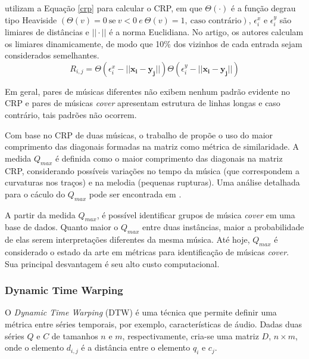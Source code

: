  utilizam a Equação \ref{crp} para calcular o CRP, em que \({\Theta(\cdot)}\) é a função degrau tipo Heaviside \({(\Theta(v) = 0 \ \textrm{se} \ v < 0 \  e \  \Theta(v) = 1, \ \textrm{caso contrário})}\), \({\epsilon_{i}^{x}}\) e \({\epsilon_{i}^{y}}\) são limiares de distâncias e \({|| \cdot ||}\) é a norma Euclidiana. No artigo, os autores calculam os limiares dinamicamente, de modo que 10\% dos vizinhos de cada entrada sejam considerados semelhantes.
\begin{equation} \label{crp}
    R_{i,j} = \Theta(\epsilon_{i}^{x} - ||\mathbf{x_{i} - y_{j}}||)\Theta(\epsilon_{i}^{y} - ||\mathbf{x_{i} - y_{j}}||)
\end{equation}

Em geral, pares de músicas diferentes não exibem nenhum padrão evidente no CRP e pares de músicas \textit{cover} apresentam estrutura de linhas longas e caso contrário, tais padrões não ocorrem.

Com base no CRP de duas músicas, o trabalho de  propõe o uso do maior comprimento das diagonais formadas na matriz como métrica de similaridade. A medida \({Q_{max}}\) é definida como o maior comprimento das diagonais na matriz CRP, considerando possíveis variações no tempo da música (que correspondem a curvaturas nos traços) e na melodia (pequenas rupturas). Uma análise detalhada para o cáculo do \({Q_{max}}\) pode ser encontrada em \cite{serra2009}.

A partir da medida \({Q_{max}}\), é possível identificar grupos de música \textit{cover} em uma base de dados. Quanto maior o \({Q_{max}}\) entre duas instâncias, maior a probabilidade de elas serem interpretações diferentes da mesma música. Até hoje, \({Q_{max}}\) é considerado o estado da arte em métricas para identificação de músicas \textit{cover}. Sua principal desvantagem é seu alto custo computacional.

\subsubsection{Dynamic Time Warping} \label{dtw}

O \textit{Dynamic Time Warping} (DTW) \cite{keogh2004} é uma técnica que permite definir uma métrica entre séries temporais, por exemplo, características de áudio. Dadas duas séries \({Q}\) e \({C}\) de tamanhos \({n}\) e \({m}\), respectivamente, cria-se uma matriz \({D}\), \({n\times m}\), onde o elemento \({d_{i,j}}\) é a distância entre o elemento \({q_{i}}\) e \({c_{j}}\).

